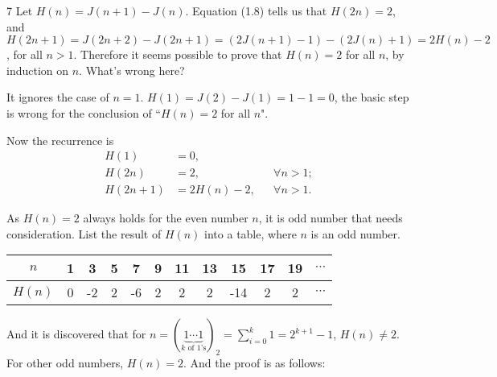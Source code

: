 \documentclass[a4paper,12pt]{article}
\makeatletter
\newtheorem*{solution}{Solution}
\theoremstyle{definition}
\renewenvironment{solution}[1][Solution] {\par\pushQED{\qed}\normalfont\topsep6\p@\@plus6\p@\relax\trivlist\item[\hskip\labelsep\bfseries#1\@addpunct{.}]\ignorespaces}{\popQED\endtrivlist\@endpefalse} \makeatother
\newenvironment{problems}{\begin{list}{}{\renewcommand{\makelabel}[1]{\textbf{##1}\hfil}}}{\end{list}}
\makeatother
\begin{document}
\begin{problems}
\begin{solution}
    \end{solution}

    \item[7] Let $H(n) = J(n + 1) - J(n)$. Equation (1.8) tells us that $H(2n) = 2$, and
    $H(2n+1) = J(2n+2)-J(2n+1) = (2J(n+1)-1) -  (2J(n)+1)= 2H(n)-2$, for all $n > 1$. Therefore it seems possible to prove that $H(n) = 2$ for all $n$, by induction on $n$. What's wrong here?

    \begin{solution}
        It ignores the case of $n=1$. $H(1)=J(2)-J(1)=1-1=0$, the basic step is wrong for the conclusion of ``$H(n)=2$ for all $n$".

        Now the recurrence is
        \begin{align*}
            H(1)&=0,&&\\
            H(2n)&=2,&&\forall n>1;\\
            H(2n+1)&=2H(n)-2,&&\forall n>1.
        \end{align*}

        As $H(n)=2$ always holds for the even number $n$, it is odd number that needs consideration. List the result of $H(n)$ into a table, where $n$ is an odd number.

        \begin{tabular}[H]{c|c|c|c|c|c|c|c|c|c|c|c}
            $n$ & 1 & 3 & 5 & 7 & 9 & 11 & 13 & 15 & 17 & 19 & $\cdots$ \\
            \hline
            $H(n)$ & 0 & -2 & 2 & -6 & 2 & 2 & 2 & -14 & 2 & 2 & $\cdots$
        \end{tabular}

        And it is discovered that for $n=(\underbrace{1\cdots 1}_{k\text{ of 1's}})_2=\sum_{i=0}^k 1=2^{k+1}-1$, $H(n)\neq 2$. For other odd numbers, $H(n)=2$. And the proof is as follows:


\end{solution}
\end{problems}
\end{document}
